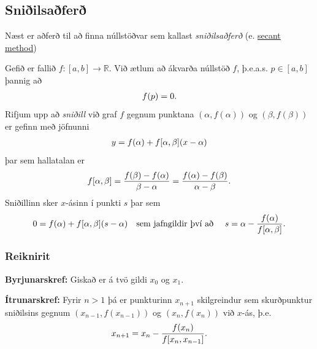 \documentclass[a4paper,10pt,icelandic]{sphinxmanual}
\begin{document}
\subsection{Sniðilsaðferð}
\label{kafli02:index-5}\label{kafli02:sniilsafer}
Næst er aðferð til að finna núllstöðvar sem kallast \emph{sniðilsaðferð}
(e. \href{https://en.wikipedia.org/wiki/Secant\_method}{secant method})

Gefið er fallið \(f:[a,b]\to {\mathbb  R}\). Við ætlum að ákvarða
núllstöð \(f\), þ.e.a.s. \(p\in [a,b]\) þannig að
\begin{gather}
\begin{split}f(p)=0.\end{split}\notag
\end{gather}
Rifjum upp að \emph{sniðill} við graf \(f\) gegnum punktana
\((\alpha,f(\alpha))\) og \((\beta,f(\beta))\) er gefinn með
jöfnunni
\begin{gather}
\begin{split}y=f(\alpha)+f[\alpha,\beta](x-\alpha)\end{split}\notag
\end{gather}
þar sem hallatalan er
\begin{gather}
\begin{split}f[\alpha,\beta]=\dfrac{f(\beta)-f(\alpha)}{\beta-\alpha}
=\dfrac{f(\alpha)-f(\beta)}{\alpha -\beta}.\end{split}\notag
\end{gather}
Sniðillinn sker \(x\)-ásinn í punkti \(s\) þar sem
\begin{gather}
\begin{split}0=f(\alpha)+f[\alpha,\beta](s-\alpha) \quad  \text{sem jafngildir því að } \quad
s=\alpha-\dfrac{f(\alpha)}{f[\alpha,\beta]}.\end{split}\notag
\end{gather}

\subsubsection{Reiknirit}
\label{kafli02:id2}
\textbf{Byrjunarskref:} Giskað er á tvö gildi \(x_0\) og \(x_1\).

\textbf{Ítrunarskref:} Fyrir \(n>1\) þá er punkturinn \(x_{n+1}\)
skilgreindur sem skurðpunktur sniðilsins gegnum \((x_{n-1},f(x_{n-1}))\) og
\((x_n,f(x_n))\) við \(x\)-ás, þ.e.
\begin{gather}
\begin{split}x_{n+1}=x_n-\dfrac{f(x_n)}{f[x_n,x_{n-1}]}.\end{split}\notag
\end{gather}
\end{document}
